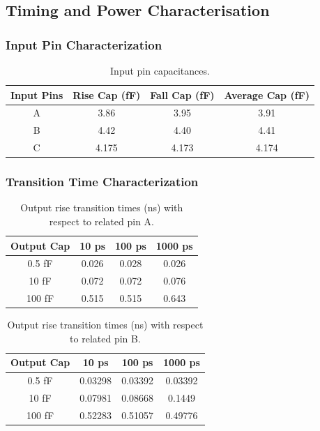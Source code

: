 \documentclass[12pt]{article}
\begin{document}
\subsection{Timing and Power Characterisation}

\subsubsection{Input Pin Characterization}

\begin{table}[H]
	\centering
	\begin{tabular}{|c|c|c|c|}
		\hline
		Input Pins & Rise Cap (fF) & Fall Cap (fF) & Average Cap (fF) \\
		\hline
		A          & 3.86          & 3.95          & 3.91             \\
		B          & 4.42          & 4.40          & 4.41             \\
		C          & 4.175         & 4.173         & 4.174            \\
		\hline
	\end{tabular}
	\caption{Input pin capacitances.}
	\label{tab:input_caps}
\end{table}

\subsubsection{Transition Time Characterization}



\begin{table}[H]
	\centering
	\begin{tabular}{|c|c|c|c|}
		\hline
		Output Cap & 10 ps & 100 ps & 1000 ps \\
		\hline
		0.5 fF     & 0.026 & 0.028  & 0.026   \\
		10 fF      & 0.072 & 0.072  & 0.076   \\
		100 fF     & 0.515 & 0.515  & 0.643   \\
		\hline
	\end{tabular}
	\caption{Output rise transition times (ns) with respect to related pin A.}
	\label{tab:rise_trans_A}
\end{table}

\begin{table}[H]
	\centering
	\begin{tabular}{|c|c|c|c|}
		\hline
		Output Cap & 10 ps   & 100 ps  & 1000 ps \\
		\hline
		0.5 fF     & 0.03298 & 0.03392 & 0.03392 \\
		10 fF      & 0.07981 & 0.08668 & 0.1449  \\
		100 fF     & 0.52283 & 0.51057 & 0.49776 \\
		\hline
	\end{tabular}
	\caption{Output rise transition times (ns) with respect to related pin B.}
	\label{tab:rise_trans_B}
\end{table}
\end{document}
